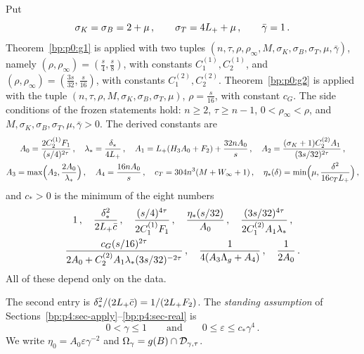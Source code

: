 \begin{definition}\label{bp:p4:parameters}
Put
\begin{equation*}
\sigma_K=\sigma_B=2+\mu\,,\qquad\sigma_T=4L_{+}+\mu\,,\qquad\bar\gamma=1\,.
\end{equation*}
Theorem~\ref{bp:p0:g1} is applied with two tuples $(n,\tau,\rho,\rho_\infty,M,\sigma_K,\sigma_B,\sigma_T,\mu,\bar\gamma)$,
namely $(\rho,\rho_\infty)=(\frac s4,\frac s8)$, with constants $C_1^{(1)},C_2^{(1)}$, and
$(\rho,\rho_\infty)=(\frac{3s}{32},\frac s{16})$, with constants $C_1^{(2)},C_2^{(2)}$.
Theorem~\ref{bp:p0:g2} is applied with the tuple $(n,\tau,\rho,M,\sigma_K,\sigma_B,\sigma_T,\mu)$,
$\rho=\frac s{16}$, with constant $c_G$. The side conditions of the frozen statements hold:
$n\ge2$, $\tau\ge n-1$, $0<\rho_\infty<\rho$, and $M,\sigma_K,\sigma_B,\sigma_T,\mu,\bar\gamma>0$.
The derived constants are
\begin{gather*}
A_0=\frac{2C_2^{(1)}F_1}{(s/4)^{2\tau}}\,,\quad
\lambda_*=\frac{\delta_*}{4L_{+}}\,,\quad
A_1=L_{+}(H_3A_0+F_2)+\frac{32nA_0}{s}\,,\quad
A_2=\frac{(\sigma_K+1)C_2^{(2)}A_1}{(3s/32)^{2\tau}}\,,\\
A_3=\max\Bigl(A_2,\frac{2A_0}{\lambda_*}\Bigr)\,,\quad
A_4=\frac{16nA_0}{s}\,,\quad
c_T=304n^3(M+W_\infty+1)\,,\quad
\eta_*(\delta)=\min\Bigl(\mu,\frac{\delta^2}{16c_TL_{+}}\Bigr)\,,
\end{gather*}
and $c_*>0$ is the minimum of the eight numbers
\begin{gather*}
1\,,\quad\frac{\delta_*^2}{2L_{+}\bar c}\,,\quad\frac{(s/4)^{4\tau}}{2C_1^{(1)}F_1}\,,\quad
\frac{\eta_*(s/32)}{A_0}\,,\quad\frac{(3s/32)^{4\tau}}{2C_1^{(2)}A_1\lambda_*}\,,\\
\frac{c_G(s/16)^{2\tau}}{2A_0+C_2^{(2)}A_1\lambda_*(3s/32)^{-2\tau}}\,,\quad
\frac1{4(A_3\Lambda_g+A_4)}\,,\quad\frac1{2A_0}\,.
\end{gather*}
All of these depend only on the data.
\end{definition}

The second entry is $\delta_*^2/(2L_{+}\bar c)=1/(2L_{+} F_2)$. The \emph{standing assumption} of
Sections~\ref{bp:p4:sec-apply}--\ref{bp:p4:sec-real} is
\begin{equation}\label{bp:p4:SA}
0<\gamma\le1\qquad\text{and}\qquad0\le\varepsilon\le c_*\gamma^4\,.
\end{equation}
We write $\eta_0=A_0\varepsilon\gamma^{-2}$ and $\Omega_\gamma=g(B)\cap\mathcal{D}_{\gamma,\tau}$.

